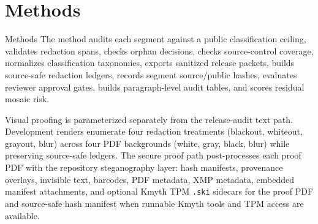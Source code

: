 \documentclass[
  ignorenonframetext,
]{beamer}
\author{\texorpdfstring{}{}}
\date{}
\begin{document}
\section{Methods}\label{methods}

\begin{frame}{Methods}
The method audits each segment against a public classification ceiling,
validates redaction spans, checks orphan decisions, checks
source-control coverage, normalizes classification taxonomies, exports
sanitized release packets, builds source-safe redaction ledgers, records
segment source/public hashes, evaluates reviewer approval gates, builds
paragraph-level audit tables, and scores residual mosaic risk.

Visual proofing is parameterized separately from the release-audit text
path. Development renders enumerate four redaction treatments (blackout,
whiteout, grayout, blur) across four PDF backgrounds (white, gray,
black, blur) while preserving source-safe ledgers. The secure proof path
post-processes each proof PDF with the repository steganography layer:
hash manifests, provenance overlays, invisible text, barcodes, PDF
metadata, XMP metadata, embedded manifest attachments, and optional
Kmyth TPM \texttt{.ski} sidecars for the proof PDF and source-safe hash
manifest when runnable Kmyth tools and TPM access are available.
\end{frame}
\end{document}
